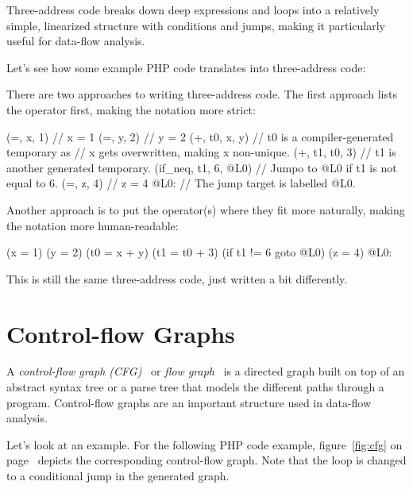 Three-address code breaks down deep expressions and loops into a relatively simple, linearized structure with conditions and jumps, making it particularly useful for data-flow analysis.

Let's see how some example PHP code translates into three-address code:


There are two approaches to writing three-address code. The first approach lists the operator first, making the notation more strict:

\begin{textcode}
     (=, x, 1)            // x = 1
     (=, y, 2)            // y = 2
     (+, t0, x, y)        // t0 is a compiler-generated temporary as
                          // x gets overwritten, making x non-unique.
     (+, t1, t0, 3)       // t1 is another generated temporary.
     (if_neq, t1, 6, @L0) // Jumpo to @L0 if t1 is not equal to 6.
     (=, z, 4)            // z = 4
@L0:                      // The jump target is labelled @L0.
\end{textcode}

Another approach is to put the operator(s) where they fit more naturally, making the notation more human-readable:

\begin{textcode}
     (x = 1)
     (y = 2)
     (t0 = x + y)
     (t1 = t0 + 3)
     (if t1 != 6 goto @L0)
     (z = 4)
@L0:
\end{textcode}

This is still the same three-address code, just written a bit differently.



\section{Control-flow Graphs}
\label{cfg}

A \emph{control-flow graph (CFG)}~\cite{chess-west} or \emph{flow graph}~\cite{compilers} is a directed graph built on top of an abstract syntax tree or a parse tree that models the different paths through a program. Control-flow graphs are an important structure used in data-flow analysis.

Let's look at an example. For the following PHP code example, figure~\ref{fig:cfg} on page~\pageref{fig:cfg} depicts the corresponding control-flow graph. Note that the loop is changed to a conditional jump in the generated graph.

